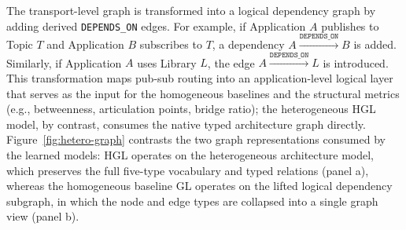 \documentclass[sigconf,9pt,anonymous]{acmart}
\begin{document}
The transport-level graph is transformed into a logical dependency graph by adding derived \texttt{DEPENDS\_ON} edges. For example, if Application $A$ publishes to Topic $T$ and Application $B$ subscribes to $T$, a dependency $A \xrightarrow{\texttt{DEPENDS\_ON}} B$ is added. Similarly, if Application $A$ uses Library $L$, the edge $A \xrightarrow{\texttt{DEPENDS\_ON}} L$ is introduced. This transformation maps pub-sub routing into an application-level logical layer that serves as the input for the homogeneous baselines and the structural metrics (e.g., betweenness, articulation points, bridge ratio); the heterogeneous HGL model, by contrast, consumes the native typed architecture graph directly. Figure~\ref{fig:hetero-graph} contrasts the two graph representations consumed by the learned models: HGL operates on the heterogeneous architecture model, which preserves the full five-type vocabulary and typed relations (panel a), whereas the homogeneous baseline GL operates on the lifted logical dependency subgraph, in which the node and edge types are collapsed into a single graph view (panel b).
\end{document}
